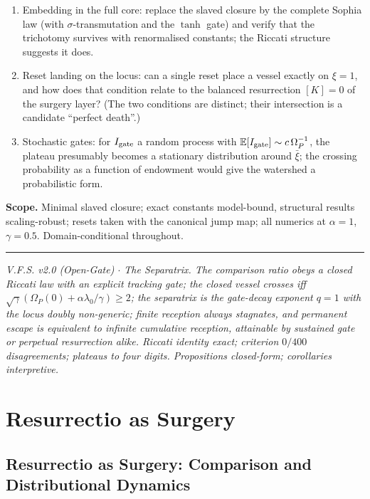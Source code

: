 \documentclass[11pt,a4paper,oneside]{book}
\newcommand{\Op}{\Omega_P}
\newcommand{\Igate}{I_{\rm gate}}
\theoremstyle{plain}
\theoremstyle{definition}
\theoremstyle{remark}
\begin{document}
\begin{enumerate}[leftmargin=1.6em,itemsep=2pt]
\item Embedding in the full core: replace the slaved closure by the complete Sophia law (with
$\sigma$-transmutation and the $\tanh$ gate) and verify that the trichotomy survives with renormalised
constants; the Riccati structure suggests it does.
\item Reset landing on the locus: can a single reset place a vessel exactly on $\xi=1$, and how does
that condition relate to the balanced resurrection $[K]=0$ of the surgery layer? (The two conditions
are distinct; their intersection is a candidate ``perfect death''.)
\item Stochastic gates: for $\Igate$ a random process with $\mathbb E[\Igate]\sim c\,\Op^{-1}$, the
plateau presumably becomes a stationary distribution around $\bar\xi$; the crossing probability as a
function of endowment would give the watershed a probabilistic form.
\end{enumerate}

\textbf{Scope.} Minimal slaved closure; exact constants model-bound, structural results
scaling-robust; resets taken with the canonical jump map; all numerics at $\alpha=1$, $\gamma=0.5$.
Domain-conditional throughout.

\vspace{0.5em}
\hrule
\smallskip
\noindent\footnotesize\emph{V.F.S. v2.0 (Open-Gate) $\cdot$ The Separatrix. The comparison ratio
obeys a closed Riccati law with an explicit tracking gate; the closed vessel crosses iff
$\sqrt\gamma(\Op(0)+\alpha\lambda_0/\gamma)\ge2$; the separatrix is the gate-decay exponent $q=1$ with
the locus doubly non-generic; finite reception always stagnates, and permanent escape is equivalent
to infinite cumulative reception, attainable by sustained gate or perpetual resurrection alike.
Riccati identity exact; criterion $0/400$ disagreements; plateaus to four digits. Propositions
closed-form; corollaries interpretive.}

\part{Resurrectio as Surgery}

\chapter{Resurrectio as Surgery: Comparison and Distributional Dynamics}
\end{document}

